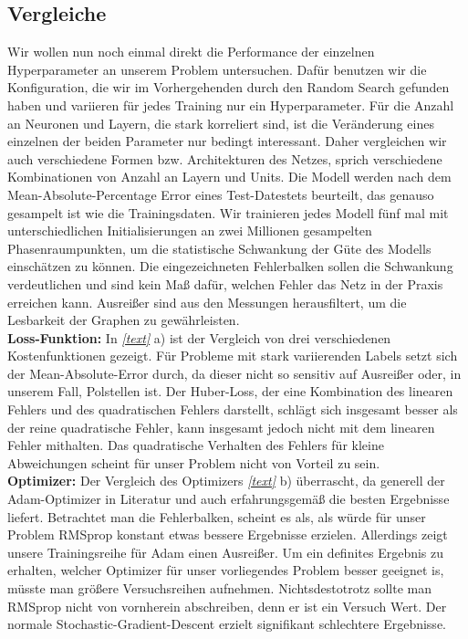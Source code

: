 \subsection{Vergleiche}
Wir wollen nun noch einmal direkt die Performance der einzelnen Hyperparameter an unserem Problem untersuchen. Dafür benutzen wir die Konfiguration, die wir im Vorhergehenden durch den Random Search gefunden haben und variieren für jedes Training nur ein Hyperparameter. Für die Anzahl an Neuronen und Layern, die stark korreliert sind, ist die Veränderung eines einzelnen der beiden Parameter nur bedingt interessant. Daher vergleichen wir auch verschiedene Formen bzw. Architekturen des Netzes, sprich verschiedene Kombinationen von Anzahl an Layern und Units. Die Modell werden nach dem Mean-Absolute-Percentage Error eines Test-Datestets beurteilt, das genauso gesampelt ist wie die Trainingsdaten. Wir trainieren jedes Modell fünf mal mit unterschiedlichen Initialisierungen an zwei Millionen gesampelten Phasenraumpunkten, um die statistische Schwankung der Güte des Modells einschätzen zu können. Die eingezeichneten Fehlerbalken sollen die Schwankung verdeutlichen und sind kein Maß dafür, welchen Fehler das Netz in der Praxis erreichen kann. Ausreißer sind aus den Messungen herausfiltert, um die Lesbarkeit der Graphen zu gewährleisten. \\
\newline
\textbf{Loss-Funktion:}
In \textit{\autoref{text}} a) ist der Vergleich von drei verschiedenen Kostenfunktionen gezeigt. Für Probleme mit stark variierenden Labels setzt sich der Mean-Absolute-Error durch, da dieser nicht so sensitiv auf Ausreißer oder, in unserem Fall, Polstellen ist. Der Huber-Loss, der eine Kombination des linearen Fehlers und des quadratischen Fehlers darstellt, schlägt sich insgesamt besser als der reine quadratische Fehler, kann insgesamt jedoch nicht mit dem linearen Fehler mithalten. Das quadratische Verhalten des Fehlers für kleine Abweichungen scheint für unser Problem nicht von Vorteil zu sein.\\
\newline
\textbf{Optimizer:}
Der Vergleich des Optimizers \textit{\autoref{text}} b) überrascht, da generell der Adam-Optimizer in Literatur und auch erfahrungsgemäß die besten Ergebnisse liefert. Betrachtet man die Fehlerbalken, scheint es als, als würde für unser Problem RMSprop konstant etwas bessere Ergebnisse erzielen. Allerdings zeigt unsere Trainingsreihe für Adam einen Ausreißer. Um ein definites Ergebnis zu erhalten, welcher Optimizer für unser vorliegendes Problem besser geeignet is, müsste man größere Versuchsreihen aufnehmen. Nichtsdestotrotz sollte man RMSprop nicht von vornherein abschreiben, denn er ist ein Versuch Wert. Der normale Stochastic-Gradient-Descent erzielt signifikant schlechtere Ergebnisse. \\
